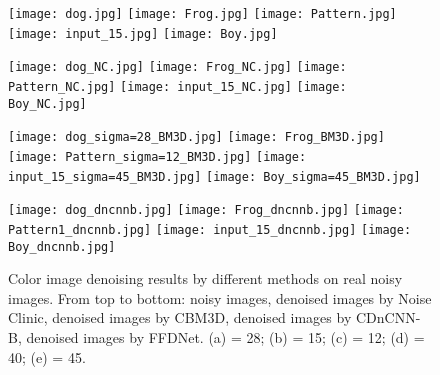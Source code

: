 \documentclass[journal]{IEEEtran}
\begin{document}
\begin{figure*}[!htbp]
\begin{center}
\subfigure
{\texttt{[image: dog.jpg]}}
\subfigure
{\texttt{[image: Frog.jpg]}}
\subfigure
{\texttt{[image: Pattern.jpg]}}
\subfigure
{\texttt{[image: input\_15.jpg]}}
\subfigure
{\texttt{[image: Boy.jpg]}}

\subfigure
{\texttt{[image: dog\_NC.jpg]}}
\subfigure
{\texttt{[image: Frog\_NC.jpg]}}
\subfigure
{\texttt{[image: Pattern\_NC.jpg]}}
\subfigure
{\texttt{[image: input\_15\_NC.jpg]}}
\subfigure
{\texttt{[image: Boy\_NC.jpg]}}

\subfigure
{\texttt{[image: dog\_sigma=28\_BM3D.jpg]}}
\subfigure
{\texttt{[image: Frog\_BM3D.jpg]}}
\subfigure
{\texttt{[image: Pattern\_sigma=12\_BM3D.jpg]}}
\subfigure
{\texttt{[image: input\_15\_sigma=45\_BM3D.jpg]}}
\subfigure
{\texttt{[image: Boy\_sigma=45\_BM3D.jpg]}}


\subfigure
{\texttt{[image: dog\_dncnnb.jpg]}}
\subfigure
{\texttt{[image: Frog\_dncnnb.jpg]}}
\subfigure
{\texttt{[image: Pattern1\_dncnnb.jpg]}}
\subfigure
{\texttt{[image: input\_15\_dncnnb.jpg]}}
\subfigure
{\texttt{[image: Boy\_dncnnb.jpg]}}\setcounter{subfigure}{0}


\caption{Color image denoising results by different methods on real noisy images. From top to bottom: noisy images, denoised images by Noise Clinic, denoised images by CBM3D, denoised images by CDnCNN-B, denoised images by FFDNet. (a)  = 28; (b)  = 15; (c)  = 12; (d)  = 40; (e)  = 45.}\label{fig_rn2}
\end{center}\end{figure*}
\end{document}
